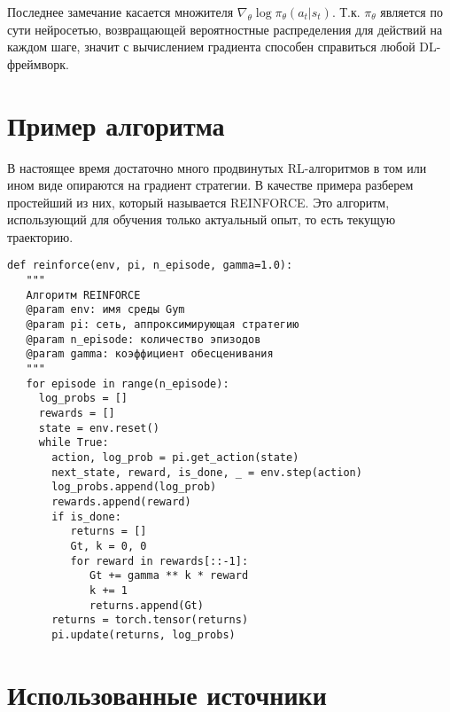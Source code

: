 \documentclass[a4paper,12pt]{article}
\numberwithin{equation}{section}
\begin{document}
Последнее замечание касается множителя $\nabla_\theta  \log \pi_\theta (a_t | s_t)$. Т.к. $\pi_\theta$ является по сути нейросетью, возвращающей вероятностные распределения для действий на каждом шаге, значит с вычислением градиента способен справиться любой DL-фреймворк. 


\section{Пример алгоритма}

В настоящее время достаточно много продвинутых RL-алгоритмов в том или ином виде опираются на градиент стратегии. В качестве примера разберем простейший из них, который называется REINFORCE. Это алгоритм, использующий для обучения только актуальный опыт, то есть текущую траекторию. 

\begin{verbatim}
def reinforce(env, pi, n_episode, gamma=1.0):
   """
   Алгоритм REINFORCE
   @param env: имя среды Gym
   @param pi: сеть, аппроксимирующая стратегию
   @param n_episode: количество эпизодов
   @param gamma: коэффициент обесценивания
   """
   for episode in range(n_episode):
     log_probs = []
     rewards = []
     state = env.reset()
     while True:
       action, log_prob = pi.get_action(state)
       next_state, reward, is_done, _ = env.step(action)
       log_probs.append(log_prob)
       rewards.append(reward)
       if is_done:
          returns = []
          Gt, k = 0, 0
          for reward in rewards[::-1]:
             Gt += gamma ** k * reward
             k += 1
             returns.append(Gt)
       returns = torch.tensor(returns)			
       pi.update(returns, log_probs)
\end{verbatim}

\section{Использованные источники}
\end{document}

